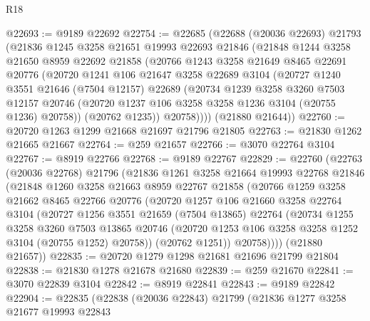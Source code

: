 \begin{lexlean}{R18}
\begin{coremodule}
@22693 := @9189 @22692
@22754 := @22685
    (@22688
      (@20036 @22693)
      @21793
      (@21836
        @1245
        @3258
        @21651
        @19993
        @22693
        @21846
        (@21848
          @1244
          @3258
          @21650
          @8959
          @22692
          @21858
          (@20766
            @1243
            @3258
            @21649
            @8465
            @22691
            @20776
            (@20720
              @1241
              @106
              @21647
              @3258
              @22689
              @3104
              (@20727
                @1240
                @3551
                @21646
                (@7504 @12157)
                @22689
                (@20734
                  @1239
                  @3258
                  @3260
                  @7503
                  @12157
                  @20746
                  (@20720 @1237 @106 @3258 @3258 @1236 @3104 (@20755 @1236) @20758))
                (@20762 @1235))
              @20758))))
      (@21880 @21644))
@22760 := @20720 @1263 @1299 @21668 @21697 @21796 @21805
@22763 := @21830 @1262 @21665 @21667
@22764 := @259 @21657
@22766 := @3070 @22764 @3104
@22767 := @8919 @22766
@22768 := @9189 @22767
@22829 := @22760
    (@22763
      (@20036 @22768)
      @21796
      (@21836
        @1261
        @3258
        @21664
        @19993
        @22768
        @21846
        (@21848
          @1260
          @3258
          @21663
          @8959
          @22767
          @21858
          (@20766
            @1259
            @3258
            @21662
            @8465
            @22766
            @20776
            (@20720
              @1257
              @106
              @21660
              @3258
              @22764
              @3104
              (@20727
                @1256
                @3551
                @21659
                (@7504 @13865)
                @22764
                (@20734
                  @1255
                  @3258
                  @3260
                  @7503
                  @13865
                  @20746
                  (@20720 @1253 @106 @3258 @3258 @1252 @3104 (@20755 @1252) @20758))
                (@20762 @1251))
              @20758))))
      (@21880 @21657))
@22835 := @20720 @1279 @1298 @21681 @21696 @21799 @21804
@22838 := @21830 @1278 @21678 @21680
@22839 := @259 @21670
@22841 := @3070 @22839 @3104
@22842 := @8919 @22841
@22843 := @9189 @22842
@22904 := @22835
    (@22838
      (@20036 @22843)
      @21799
      (@21836
        @1277
        @3258
        @21677
        @19993
        @22843

\end{coremodule}
\end{lexlean}
